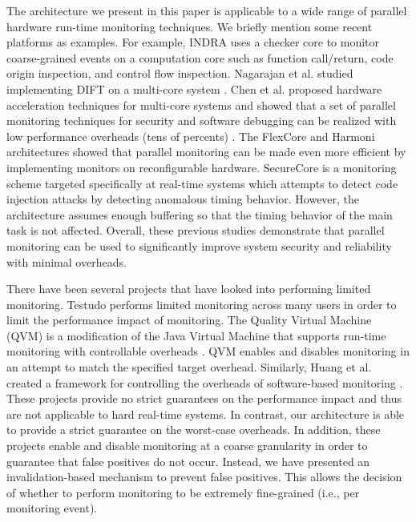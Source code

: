 The architecture we present in this paper is applicable to a wide range of
parallel hardware run-time monitoring techniques. We briefly mention some recent
platforms as examples. For example, INDRA \cite{indra-isca06} uses a checker
core to monitor coarse-grained events on a computation core such as function
call/return, code origin inspection, and control flow inspection.  Nagarajan et
al. studied implementing DIFT on a multi-core system \cite{nagarajan08-dift}.
Chen et al. proposed hardware acceleration techniques for multi-core systems
and showed that a set of parallel monitoring techniques for security and
software debugging can be realized with low performance overheads (tens of
percents) \cite{chen08-lba}. The FlexCore \cite{flexcore-micro10} and
Harmoni \cite{harmoni-dsn12} architectures showed that parallel monitoring
can be made even more efficient by implementing monitors on reconfigurable
hardware. SecureCore \cite{yoon-securecore-rtas13} is a monitoring scheme
targeted specifically at real-time systems which attempts to detect code
injection attacks by detecting anomalous timing behavior. However, the
architecture assumes enough buffering so that the timing behavior of the main
task is not affected. Overall, these previous
studies demonstrate that parallel monitoring can be used to significantly
improve system security and reliability with minimal overheads.

There have been several projects that have looked into performing limited
monitoring. 
Testudo \cite{testudo-micro08} performs
limited monitoring across many users in order to limit the performance impact
of monitoring. The Quality Virtual Machine (QVM) is a modification of the Java
Virtual Machine that supports run-time monitoring with controllable overheads
\cite{qvm-oopsla08}. QVM enables and disables monitoring in an attempt to match
the specified target overhead. 
Similarly, Huang et al. created a framework for controlling the overheads of
software-based monitoring \cite{huang-sttt12}. 
These projects provide no strict guarantees on the performance impact and thus
are not applicable to hard real-time systems.
In contrast, our architecture is able to provide a strict guarantee on the
worst-case overheads. In addition, these projects enable and disable monitoring
at a coarse granularity in order to guarantee that false positives do not occur. Instead, we have
presented an invalidation-based mechanism to prevent false positives. This 
allows the decision of whether to perform monitoring to be extremely
fine-grained (i.e., per monitoring event).

